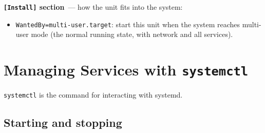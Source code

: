 \begin{codebox}[short]

\begin{Shaded}
\begin{Highlighting}[]
\KeywordTok{[Install]}
\OtherTok{=}
\end{Highlighting}
\end{Shaded}

\end{codebox}

\noindent{}\textbf{\texttt{{[}Install{]}} section}~--- how the unit fits into the system:

\begin{itemize}
\tightlist
\item
  \texttt{WantedBy=}\allowbreak{}\texttt{multi-}\allowbreak{}\texttt{user.}\allowbreak{}\texttt{target}: start this unit when the system reaches multi-user mode (the normal running state, with network and all services).
\end{itemize}

\setcounter{section}{2}
\section{\texorpdfstring{Managing Services with \texttt{systemctl}}{Managing Services with systemctl}}\label{25-process-management:253-managing-services-with-systemctl}

\texttt{systemctl} is the command for interacting with systemd.

\subsection*{Starting and stopping}\label{25-process-management:starting-and-stopping}

